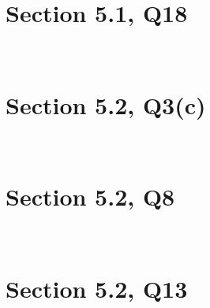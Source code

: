 \documentclass[12pt]{article}%
\begin{document}
~\ 

\section{Section 5.1, Q18}

~\ 

\section{Section 5.2, Q3(c)}

~\ 

\section{Section 5.2, Q8}

~\ 

\section{Section 5.2, Q13}

~\ 
\end{document}
